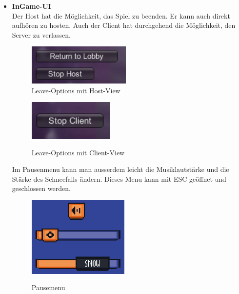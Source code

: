 \begin{itemize}
\begin {itemize}
        \item \textbf{InGame-UI}\\
            Der Host hat die Möglichkeit, das Spiel zu beenden. Er kann auch direkt aufhören zu hosten. 
            Auch der Client hat durchgehend die Möglichkeit, den Server zu verlassen.
            \begin{figure}[H]
                \centering
                \begin{minipage}[H]{7cm}
                \centering
                \includegraphics[height=2cm]{resources/returnlobby.png}\\
                \caption{Leave-Options mit Host-View}
                \end{minipage}
                \begin{minipage}[H]{7cm}
                \centering
                \includegraphics[height=2cm]{resources/stopclient.png}\\
                \caption{Leave-Options mit Client-View}
                \end{minipage}
            \end{figure}
            Im Pausenmenu kann man ausserdem leicht die Musiklautstärke und die Stärke des Schneefalls ändern. Dieses Menu kann mit ESC geöffnet und geschlossen werden.
            \begin{figure}[H]
                \centering
                \includegraphics[height=4cm]{resources/pause.png}\\
                \caption{Pausemenu}
            \end{figure}
            

\end{itemize}
\end{itemize}
